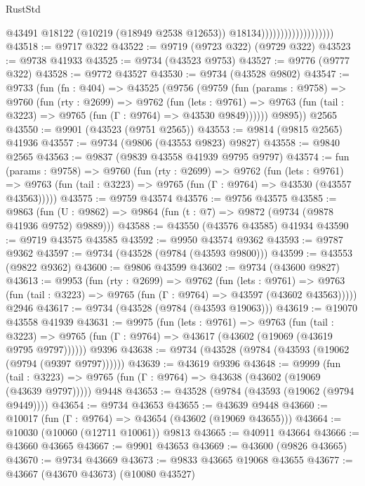 \begin{lexlean}{RustStd}
\begin{coremodule}
                                          @43491
                                          @18122
                                          (@10219 (@18949 @2538 @12653))
                                          @18134)))))))))))))))))))
@43518 := @9717 @322
@43522 := @9719 (@9723 @322) (@9729 @322)
@43523 := @9738 @41933
@43525 := @9734 (@43523 @9753)
@43527 := @9776 (@9777 @322)
@43528 := @9772 @43527
@43530 := @9734 (@43528 @9802)
@43547 := @9733
    (fun (fn : @404) =>
    @43525
      (@9756
        (@9759
          (fun (params : @9758) =>
          @9760
            (fun (rty : @2699) =>
            @9762
              (fun (lets : @9761) =>
              @9763 (fun (tail : @3223) => @9765 (fun (Γ : @9764) => @43530 @9849))))))
        @9895))
    @2565
@43550 := @9901 (@43523 (@9751 @2565))
@43553 := @9814 (@9815 @2565) @41936
@43557 := @9734 (@9806 (@43553 @9823) @9827)
@43558 := @9840 @2565
@43563 := @9837 (@9839 @43558 @41939 @9795 @9797)
@43574 := fun (params : @9758) =>
  @9760
    (fun (rty : @2699) =>
    @9762
      (fun (lets : @9761) =>
      @9763 (fun (tail : @3223) => @9765 (fun (Γ : @9764) => @43530 (@43557 @43563)))))
@43575 := @9759 @43574
@43576 := @9756 @43575
@43585 := @9863
    (fun (U : @9862) => @9864 (fun (t : @7) => @9872 (@9734 (@9878 @41936 @9752) @9889)))
@43588 := @43550 (@43576 @43585) @41934
@43590 := @9719 @43575 @43585
@43592 := @9950 @43574 @9362
@43593 := @9787 @9362
@43597 := @9734 (@43528 (@9784 (@43593 @9800)))
@43599 := @43553 (@9822 @9362)
@43600 := @9806 @43599
@43602 := @9734 (@43600 @9827)
@43613 := @9953
    (fun (rty : @2699) =>
    @9762
      (fun (lets : @9761) =>
      @9763 (fun (tail : @3223) => @9765 (fun (Γ : @9764) => @43597 (@43602 @43563)))))
    @2946
@43617 := @9734 (@43528 (@9784 (@43593 @19063)))
@43619 := @19070 @43558 @41939
@43631 := @9975
    (fun (lets : @9761) =>
    @9763
      (fun (tail : @3223) =>
      @9765 (fun (Γ : @9764) => @43617 (@43602 (@19069 (@43619 @9795 @9797))))))
    @9396
@43638 := @9734 (@43528 (@9784 (@43593 (@19062 (@9794 (@9397 @9797))))))
@43639 := @43619 @9396
@43648 := @9999
    (fun (tail : @3223) => @9765 (fun (Γ : @9764) => @43638 (@43602 (@19069 (@43639 @9797)))))
    @9448
@43653 := @43528 (@9784 (@43593 (@19062 (@9794 @9449))))
@43654 := @9734 @43653
@43655 := @43639 @9448
@43660 := @10017 (fun (Γ : @9764) => @43654 (@43602 (@19069 @43655)))
@43664 := @10030 (@10060 (@12711 @10061)) @9813
@43665 := @40911 @43664
@43666 := @43660 @43665
@43667 := @9901 @43653
@43669 := @43600 (@9826 @43665)
@43670 := @9734 @43669
@43673 := @9833 @43665 @19068 @43655
@43677 := @43667 (@43670 @43673) (@10080 @43527)

\end{coremodule}
\end{lexlean}
